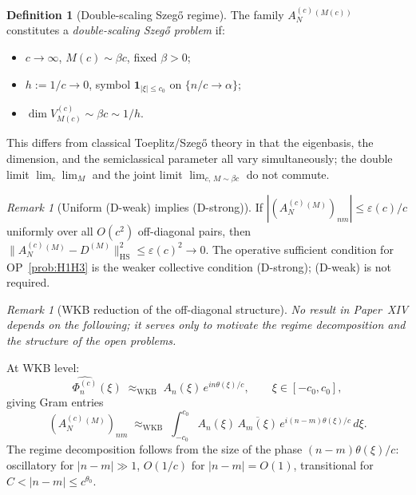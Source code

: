 \documentclass[12pt,a4paper]{amsart}
\theoremstyle{definition}
\newtheorem{definition}[theorem]{Definition}
\theoremstyle{remark}
\newtheorem{remark}[theorem]{Remark}
\newcommand{\Ac}{A_N^{(c)}}
\begin{document}
\begin{definition}[Double-scaling
  Szeg\H{o} regime]
\label{def:double-scaling}
The family $\Ac^{(M(c))}$ constitutes
a \emph{double-scaling Szeg\H{o}
problem} if:
\begin{itemize}[leftmargin=*]
\item $c\to\infty$,
  $M(c)\sim\beta c$,
  fixed $\beta>0$;
\item $h:=1/c\to 0$,
  symbol $\mathbf{1}_{|\xi|\le c_0}$
  on $\{n/c\to\alpha\}$;
\item $\dim V_{M(c)}^{(c)}\sim\beta c
  \sim 1/h$.
\end{itemize}
This differs from classical
Toeplitz/Szeg\H{o} theory in that
the eigenbasis, the dimension, and
the semiclassical parameter all vary
simultaneously; the double limit
$\lim_c\lim_M$ and the joint limit
$\lim_{c,\,M\sim\beta c}$
do not commute.
\end{definition}

\begin{remark}[Uniform (D-weak)
  implies (D-strong)]
\label{rem:double-scaling}
If $|(\Ac^{(M)})_{nm}|
\le\varepsilon(c)/c$ uniformly over
all $O(c^2)$ off-diagonal pairs, then
$\|\Ac^{(M)}-D^{(M)}\|_{\mathrm{HS}}^2
\le\varepsilon(c)^2\to 0$.
The operative sufficient condition
for OP~\ref{prob:H1H3} is the weaker
collective condition (D-strong);
(D-weak) is not required.
\end{remark}

\begin{remark}[WKB reduction of the
  off-diagonal structure]
\label{rem:WKB-reduction}
\emph{No result in Paper~XIV depends
on the following; it serves only to
motivate the regime decomposition
and the structure of the open problems.}

\medskip\noindent
At WKB level:
\begin{equation}\label{eq:WKB-heuristic}
  \widehat{\Phi_n^{(c)}}(\xi)
  \;\approx_{\mathrm{WKB}}\;
  A_n(\xi)\,e^{i n \theta(\xi)/c},
  \qquad \xi\in[-c_0,c_0],
\end{equation}
giving Gram entries
\begin{equation}\label{eq:WKB-gram}
  (\Ac^{(M)})_{nm}
  \;\approx_{\mathrm{WKB}}\;
  \int_{-c_0}^{c_0}
  A_n(\xi)\,\overline{A_m(\xi)}\,
  e^{i(n-m)\theta(\xi)/c}\,d\xi.
\end{equation}
The regime decomposition follows from
the size of the phase
$(n-m)\theta(\xi)/c$:
oscillatory for $|n-m|\gg 1$,
$O(1/c)$ for $|n-m|=O(1)$,
transitional for
$C<|n-m|\le c^{\theta_0}$.
\end{remark}
\end{document}
